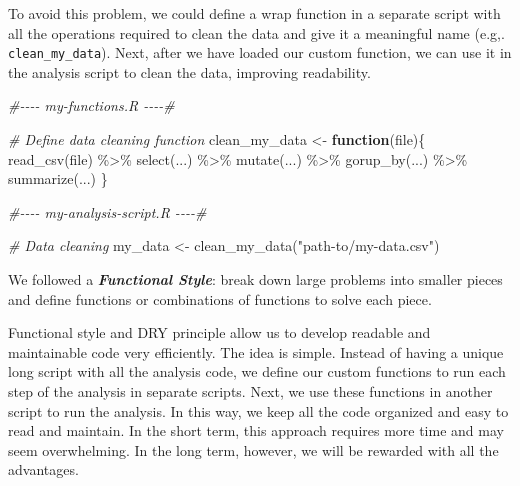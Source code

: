 \documentclass[
  11pt,
]{book}
\newenvironment{Shaded}{\begin{snugshade}}{\end{snugshade}}
\newcommand{\CommentTok}[1]{\textcolor[rgb]{0.56,0.35,0.01}{\textit{#1}}}
\newcommand{\ControlFlowTok}[1]{\textcolor[rgb]{0.13,0.29,0.53}{\textbf{#1}}}
\newcommand{\FunctionTok}[1]{\textcolor[rgb]{0.00,0.00,0.00}{#1}}
\newcommand{\NormalTok}[1]{#1}
\newcommand{\OtherTok}[1]{\textcolor[rgb]{0.56,0.35,0.01}{#1}}
\newcommand{\SpecialCharTok}[1]{\textcolor[rgb]{0.00,0.00,0.00}{#1}}
\newcommand{\StringTok}[1]{\textcolor[rgb]{0.31,0.60,0.02}{#1}}
\newenvironment{code-tex-good}
  {\begingroup\definecolor{shadecolor}{RGB}{224, 240, 227}}
  {\endgroup}
\begin{document}
To avoid this problem, we could define a wrap function in a separate script with all the operations required to clean the data and give it a meaningful name (e.g,. \texttt{clean\_my\_data}). Next, after we have loaded our custom function, we can use it in the analysis script to clean the data, improving readability.

\begin{code-tex-good}

\begin{Shaded}
\begin{Highlighting}[]
\CommentTok{\#{-}{-}{-}{-}    my{-}functions.R    {-}{-}{-}{-}\#}

\CommentTok{\# Define data cleaning function}
\NormalTok{clean\_my\_data }\OtherTok{\textless{}{-}} \ControlFlowTok{function}\NormalTok{(file)\{}
  \FunctionTok{read\_csv}\NormalTok{(file) }\SpecialCharTok{\%\textgreater{}\%} 
    \FunctionTok{select}\NormalTok{(...) }\SpecialCharTok{\%\textgreater{}\%} 
    \FunctionTok{mutate}\NormalTok{(...) }\SpecialCharTok{\%\textgreater{}\%} 
    \FunctionTok{gorup\_by}\NormalTok{(...) }\SpecialCharTok{\%\textgreater{}\%} 
    \FunctionTok{summarize}\NormalTok{(...)}
\NormalTok{\}}

\CommentTok{\#{-}{-}{-}{-}    my{-}analysis{-}script.R    {-}{-}{-}{-}\#}

\CommentTok{\# Data cleaning}
\NormalTok{my\_data }\OtherTok{\textless{}{-}} \FunctionTok{clean\_my\_data}\NormalTok{(}\StringTok{"path{-}to/my{-}data.csv"}\NormalTok{)}
\end{Highlighting}
\end{Shaded}

\end{code-tex-good}

We followed a \textbf{\emph{Functional Style}}: break down large problems into smaller pieces and define functions or combinations of functions to solve each piece.

Functional style and DRY principle allow us to develop readable and maintainable code very efficiently. The idea is simple. Instead of having a unique long script with all the analysis code, we define our custom functions to run each step of the analysis in separate scripts. Next, we use these functions in another script to run the analysis. In this way, we keep all the code organized and easy to read and maintain. In the short term, this approach requires more time and may seem overwhelming. In the long term, however, we will be rewarded with all the advantages.
\end{document}
